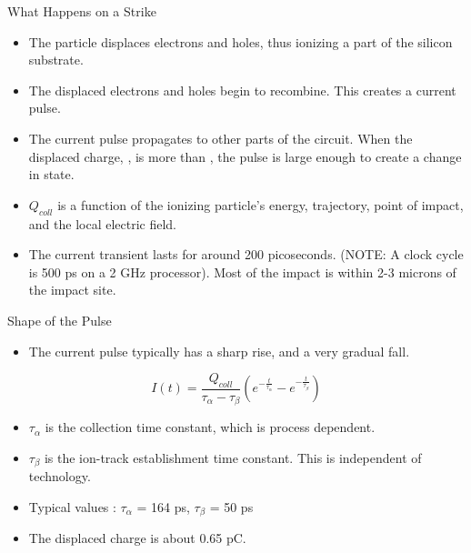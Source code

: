\documentclass{beamer}
\begin{document}
\begin{frame}{What Happens on a Strike}
\begin{itemize}
  \item The particle displaces electrons and holes, thus ionizing a part of the silicon substrate.
\pause
  \item The displaced electrons and holes begin to recombine. This creates a current pulse.
\pause
  \item The current pulse propagates to other parts of the circuit. When the displaced charge, {} , is more than {}, the pulse
      is large enough to create a change in state.
\pause
  \item $Q_{coll}$ is a function of the ionizing particle's energy, trajectory, point of impact, and the local electric field. 
\pause
  \item The current transient lasts for around 200 picoseconds. (NOTE: A clock cycle is 500 ps on a 2 GHz processor). Most of the impact 
	is within 2-3 microns of the impact site.
\end{itemize}
\end{frame}

\begin{frame}{Shape of the Pulse}
\begin{itemize}
 \item The current pulse typically has a sharp rise, and a very gradual fall.
\end{itemize}

\begin{equation*}
 I(t) = \frac {Q_{coll}}{\tau_\alpha - \tau_\beta} \left ( e^{-\frac{t}{\tau_\alpha}} - e^{-\frac{t}{\tau_\beta}} \right )
\end{equation*}

\begin{itemize}
 \item $\tau_\alpha$ is the collection time constant, which is process dependent.
  \item $\tau_\beta$ is the ion-track establishment time constant. This is independent of technology. 
   \item Typical values : $\tau_\alpha$ = 164 ps, $\tau_\beta$ = 50 ps
  \item The displaced charge is about 0.65 pC. 
\end{itemize}

\end{frame}
\end{document}
